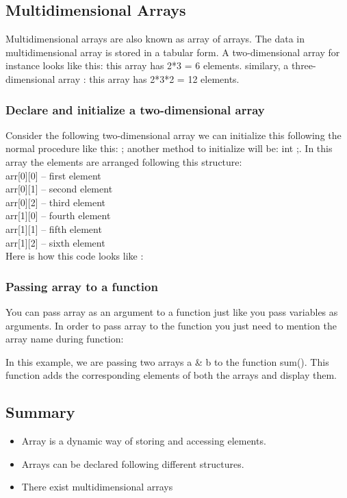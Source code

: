 \documentclass[11pt, a4paper]{article}
\begin{document}
\subsection{Multidimensional Arrays}
Multidimensional arrays are also known as array of arrays. The data in multidimensional array
is stored in a tabular form. A two-dimensional array for instance looks like this:
 this array has 2*3 = 6 elements. similary, a three-dimensional array :
 this array has 2*3*2 = 12 elements.

\subsubsection{Declare and initialize a two-dimensional array}
Consider the following two-dimensional array  we can initialize this following
the normal procedure like this: ; another method to initialize
will be: int ;. In this array the elements are arranged
following this structure: \\
arr[0][0] – first element\\
arr[0][1] – second element\\
arr[0][2] – third element\\
arr[1][0] – fourth element\\
arr[1][1] – fifth element\\
arr[1][2] – sixth element\\
Here is how this code looks like :


\subsubsection{Passing array to a function}
You can pass array as an argument to a function just like you pass variables as arguments.
In order to pass array to the function you just need to mention the array name during
function: 

In this example, we are passing two arrays a \& b to the function sum().
This function adds the corresponding elements of both the arrays and display them.

\subsection{Summary}
\begin{itemize}
    \item Array is a dynamic way of storing and accessing elements.
    \item Arrays can be declared following different structures.
    \item There exist multidimensional arrays
\end{itemize}
\end{document}
